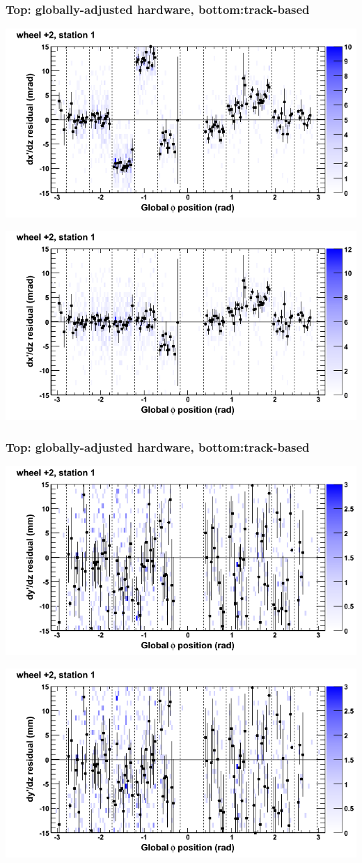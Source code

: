 \documentclass[compress]{beamer}
\begin{document}
\begin{frame}
\frametitle{Top: globally-adjusted hardware, bottom:track-based}
\includegraphics[width=0.7\linewidth]{NOV4_mapplots_HW/DTvsphi_st1whE_dxdz.png}

\includegraphics[width=0.7\linewidth]{NOV4_mapplots/DTvsphi_st1whE_dxdz.png}
\end{frame}

\begin{frame}
\frametitle{Top: globally-adjusted hardware, bottom:track-based}
\includegraphics[width=0.7\linewidth]{NOV4_mapplots_HW/DTvsphi_st1whE_dydz.png}

\includegraphics[width=0.7\linewidth]{NOV4_mapplots/DTvsphi_st1whE_dydz.png}
\end{frame}
\end{document}
